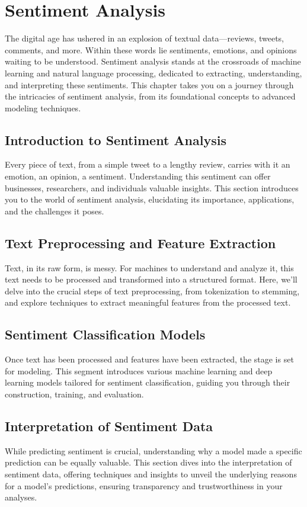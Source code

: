 \documentclass[a4paper,12pt]{book}
\begin{document}
\chapter{Sentiment Analysis}
The digital age has ushered in an explosion of textual data—reviews, tweets, comments, and more. Within these words lie sentiments, emotions, and opinions waiting to be understood. Sentiment analysis stands at the crossroads of machine learning and natural language processing, dedicated to extracting, understanding, and interpreting these sentiments. This chapter takes you on a journey through the intricacies of sentiment analysis, from its foundational concepts to advanced modeling techniques.

\section{Introduction to Sentiment Analysis}
Every piece of text, from a simple tweet to a lengthy review, carries with it an emotion, an opinion, a sentiment. Understanding this sentiment can offer businesses, researchers, and individuals valuable insights. This section introduces you to the world of sentiment analysis, elucidating its importance, applications, and the challenges it poses.

\section{Text Preprocessing and Feature Extraction}
Text, in its raw form, is messy. For machines to understand and analyze it, this text needs to be processed and transformed into a structured format. Here, we'll delve into the crucial steps of text preprocessing, from tokenization to stemming, and explore techniques to extract meaningful features from the processed text.

\section{Sentiment Classification Models}
Once text has been processed and features have been extracted, the stage is set for modeling. This segment introduces various machine learning and deep learning models tailored for sentiment classification, guiding you through their construction, training, and evaluation.

\section{Interpretation of Sentiment Data}
While predicting sentiment is crucial, understanding why a model made a specific prediction can be equally valuable. This section dives into the interpretation of sentiment data, offering techniques and insights to unveil the underlying reasons for a model's predictions, ensuring transparency and trustworthiness in your analyses.
\end{document}
